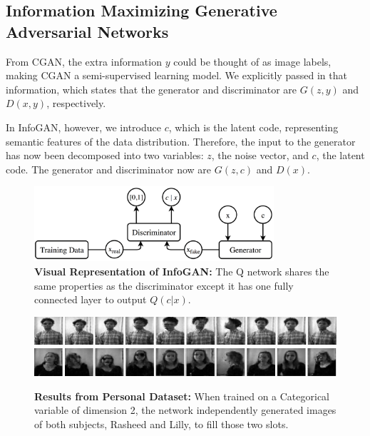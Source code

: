 \documentclass[conference,11pt]{IEEEtran}
\begin{document}
\subsection{Information Maximizing Generative Adversarial Networks}

From CGAN, the extra information $y$ could be thought of as image labels, making CGAN a semi-supervised learning model.  We explicitly passed in that information, which states that the generator and discriminator are $G(z,y)$ and $D(x,y)$, respectively.  

In InfoGAN, however, we introduce $c$, which is the latent code, representing semantic features of the data distribution.  Therefore, the input to the generator has now been decomposed into two variables: $z$, the noise vector, and $c$, the latent code.  The generator and discriminator now are $G(z,c)$ and $D(x)$.  

\begin{figure}
\includegraphics[width=3.5in]{pictures/diagram.png}
\caption{\textbf{Visual Representation of InfoGAN:} The Q network shares the same properties as the discriminator except it has one fully connected layer to output $Q(c|x)$.}  
\end{figure}


\begin{figure}
    \centering
    \includegraphics[width=7.25in]{pictures/personal/rasheed-flipped.jpg}\vspace*{2mm}
    \hspace*{.15mm}\includegraphics[width=7.25in]{pictures/personal/lilly-flipped.jpg}
    \caption{\textbf{Results from Personal Dataset:} When trained on a Categorical variable of dimension 2, the network independently generated images of both subjects, Rasheed and Lilly, to fill those two slots.}
\end{figure}
\end{document}
